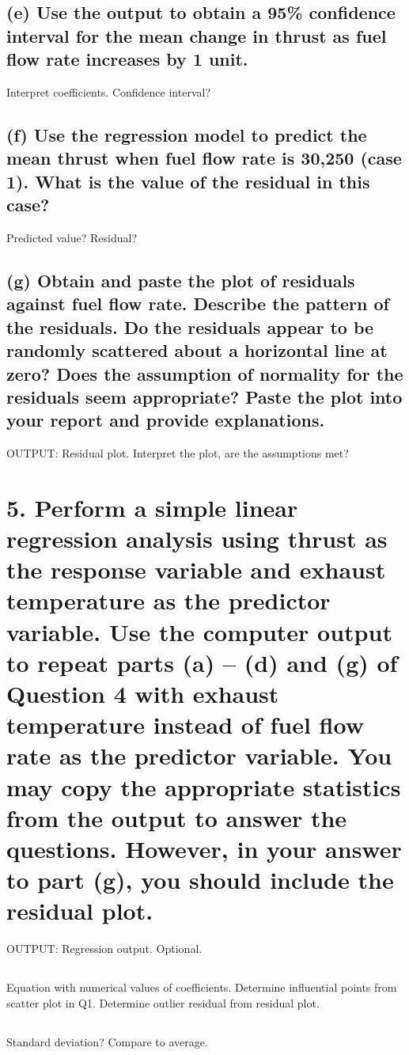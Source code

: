 \documentclass[letterpaper]{article}
\begin{document}
\subsection{(e)	Use the output to obtain a 95\% confidence interval for the mean change in thrust as fuel flow rate increases by 1 unit.}
Interpret coefficients. Confidence interval?

\subsection{(f)	Use the regression model to predict the mean thrust when fuel flow rate is 30,250 (case 1). What is the value of the residual in this case?}
Predicted value? Residual?

\subsection{(g)	Obtain and paste the plot of residuals against fuel flow rate. Describe the pattern of the residuals. Do the residuals appear to be randomly scattered about a horizontal line at zero? Does the assumption of normality for the residuals seem appropriate? Paste the plot into your report and provide explanations.}
OUTPUT: Residual plot. Interpret the plot, are the assumptions met?

\section{5.	Perform a simple linear regression analysis using thrust as the response variable and exhaust temperature as the predictor variable. Use the computer output to repeat parts (a) – (d) and (g) of Question 4 with exhaust temperature instead of fuel flow rate as the predictor variable. You may copy the appropriate statistics from the output to answer the questions. However, in your answer to part (g), you should include the residual plot.}
OUTPUT: Regression output. Optional.

\subsection{}
Equation with numerical values of coefficients. Determine
influential points from scatter plot in Q1. Determine outlier residual from residual plot.

\subsection{}
Standard deviation? Compare to average.
\end{document}

